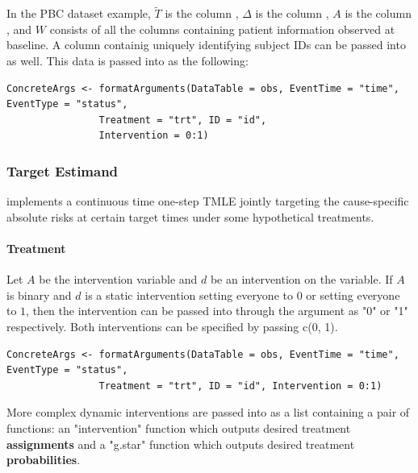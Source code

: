 \documentclass{report}
\newcommand{\1}{\ensuremath{\mathbf{1}}}
\newcommand{\T}{\ensuremath{\widetilde{T}}}
\renewcommand{\L}{\ensuremath{W}}
\begin{document}
In the PBC dataset example, \(\T\) is the column , \(\Delta\) is the column , \(A\) is the column , and \(\L\) consists of all the columns containing patient information observed at baseline. A column containig uniquely identifying subject IDs can be passed into  as well. This data is passed into  as the following:
\begin{lstlisting}
ConcreteArgs <- formatArguments(DataTable = obs, EventTime = "time", EventType = "status", 
				Treatment = "trt", ID = "id",
				Intervention = 0:1)
\end{lstlisting}

\subsubsection{Target Estimand}
\label{Estimand}
 implements a continuous time one-step TMLE jointly targeting the cause-specific absolute risks at certain target times under some hypothetical treatments. 

\paragraph{Treatment}
\label{TreatmentRegime}
Let \(A\) be the intervention variable and \(d\) be an intervention on the variable. If \(A\) is binary and \(d\) is a static intervention setting everyone to \(0\) or setting everyone to \(1\), then the intervention can be passed into  through the argument  as "0" or "1" respectively. Both interventions can be specified by passing c(0, 1).

\begin{lstlisting}
ConcreteArgs <- formatArguments(DataTable = obs, EventTime = "time", EventType = "status", 
				Treatment = "trt", ID = "id", Intervention = 0:1)
\end{lstlisting}

More complex dynamic interventions are passed into  as a list containing a pair of functions: an "intervention" function which outputs desired treatment \textbf{\textbf{assignments}} and a "g.star" function which outputs desired treatment \textbf{\textbf{probabilities}}.
\end{document}
